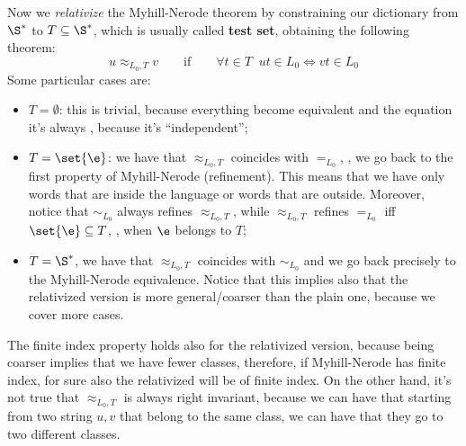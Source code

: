 \documentclass[oneside]{academica}
\begin{document}
Now we \emph{relativize} the Myhill-Nerode theorem by constraining our dictionary from $\S^*$ to $T \subseteq \S^*$, which is usually called \textbf{test set}, obtaining the following theorem:
\begin{equation*}
  u \approx_{L_0,T} v \qquad \text{if} \qquad \forall t \in T \;\; ut \in L_0 \iff vt \in L_0
\end{equation*}
Some particular cases are:
\begin{itemize}
  \item $T = \emptyset$: this is trivial, because everything become equivalent and the equation it's always \true, because it's ``independent'';
  \item $T = \set{\e}$: we have that $\approx_{L_0,T}$ coincides with $=_{L_0}$, \ie, we go back to the first property of Myhill-Nerode (refinement). This means that we have only words that are inside the language or words that are outside. Moreover, notice that $\sim_{L_0}$ always refines $\approx_{L_0,T}$, while $\approx_{L_0,T}$ refines $=_{L_0}$ iff $\set{\e} \subseteq T$, \ie, when $\e$ belongs to $T$;
  \item $T = \S^*$, we have that $\approx_{L_0,T}$ coincides with $\sim_{L_0}$ and we go back precisely to the Myhill-Nerode equivalence. Notice that this implies also that the relativized version is more general/coarser than the plain one, because we cover more cases.
\end{itemize}

The finite index property holds also for the relativized version, because being coarser implies that we have fewer classes, therefore, if Myhill-Nerode has finite index, for sure also the relativized will be of finite index.
On the other hand, it's not true that $\approx_{L_0,T}$ is always right invariant, because we can have that starting from two string $u,v$ that belong to the same class, we can have that they go to two different classes.
\end{document}
